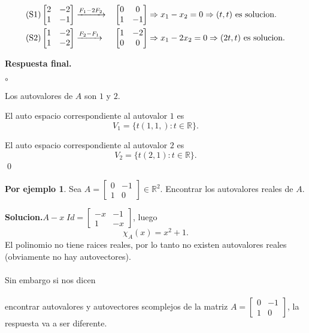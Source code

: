 \documentclass{article}
\theoremstyle{definition}
\theoremstyle{definition}
\newtheorem*{ej}{Por ejemplo}
\theoremstyle{remark}
\begin{document}
\begin{enumerate}[label=\arabic*.]
\begin{equation}
      \end{equation}\begin{equation}\notag\begin{aligned}
      (\text{S1}) &\begin{bmatrix} 2 & -2 \\ 1 & -1 \end{bmatrix} \xrightarrow{F_1-2F_2}&&\begin{bmatrix}0 & 0 \\ 1 & -1 \end{bmatrix} \Rightarrow x_1 -x_2 = 0 \Rightarrow (t,t) \text{ es solucion}.
\\
      (\text{S2}) &\begin{bmatrix} 1 & -2 \\ 1 & -2 \end{bmatrix} \xrightarrow{F_2-F_1} &&\begin{bmatrix}  1 & -2 \\ 0 & 0 \end{bmatrix} \Rightarrow x_1 -2x_2 = 0 \Rightarrow (2t,t) \text{ es solucion.}
    \end{aligned}
    \end{equation}
\end{enumerate}
\textbf{Respuesta final.} 
\begin{list}{$\circ$}{}  
\item Los autovalores de $A$ son $1$ y $2$. 
\item El auto espacio correspondiente al autovalor $1$ es \[
    V_1=\{t(1,1,):t \in \mathbb{R}\}.
  \]
\item El auto espacio correspondiente al autovalor $2$ es 
  \[
    V_2=\{t(2,1): t \in \mathbb{R}\}.
  \]
  \qed
\end{list}
\begin{ej}
  Sea $A = \begin{bmatrix} 0 & -1 \\ 1 & 0 \end{bmatrix} \in \mathbb{R}^2$. Encontrar los autovalores reales de $A$. 
\end{ej}
\textbf{Solucion.}$A-x \; Id=\begin{bmatrix}-x & -1 \\ 1 & -x \end{bmatrix}$, luego \[
\chi_A(x)=x^2+1.
\]
El polinomio no tiene raices reales, por lo tanto no existen autovalores reales (obviamente no hay autovectores).
\\\\
Sin embargo si nos dicen \\\\ encontrar autovalores y autovectores scomplejos de la matriz $A=\begin{bmatrix}0 & -1 \\ 1 & 0 \end{bmatrix}$, la respuesta va a ser diferente.\\\\
\end{document}
